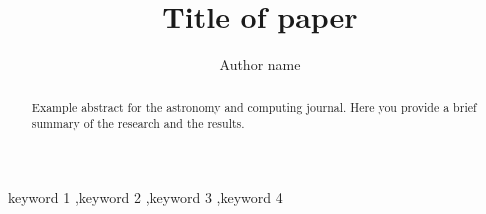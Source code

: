 \documentclass[final,5p,times,twocolumn,authoryear]{elsarticle}
\begin{document}
\begin{frontmatter}



\title{Title of paper}


\author[first]{Author name}

\begin{abstract}
Example abstract for the astronomy and computing journal. Here you provide a brief summary of the research and the results.
\end{abstract}



\begin{keyword}
keyword 1 \sep keyword 2 \sep keyword 3 \sep keyword 4



\end{keyword}


\end{frontmatter}
\end{document}
